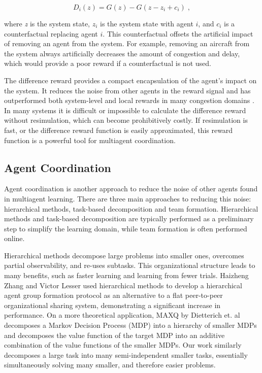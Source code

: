 \documentclass[onehalf,11pt]{beavtex}
\begin{document}
\begin{equation}
D_i(z) = G(z) - G(z - z_i + c_i)\;,
\end{equation}

where \textit{z} is the system state, $z_i$ is the system state with agent $i$, and $c_i$ is a counterfactual replacing agent $i$. This counterfactual offsets the artificial impact of removing an agent from the system. For example, removing an aircraft from the system always artificially decreases the amount of congestion and delay, which would provide a poor reward if a counterfactual is not used.

The difference reward provides a compact encapsulation of the agent's impact on the system. It reduces the noise from other agents in the reward signal and has outperformed both system-level and local rewards in many congestion domains \cite{AAMAS12-agmon, tumer-agogino_jaamas08, Agogino:2012:ELS:2330163.2330306, Colby:2012:SFF:2343576.2343637, Sislak:2008:AMA:1402744.1402755, tumer-wolpert_jair02}. In many systems it is difficult or impossible to calculate the difference reward without resimulation, which can become prohibitively costly. If resimulation is fast, or the difference reward function is easily approximated, this reward function is a powerful tool for multiagent coordination.

\subsection{Agent Coordination}

Agent coordination \cite{Nwana96co-ordinationin} is another approach to reduce the noise of other agents found in multiagent learning. There are three main approaches to reducing this noise: hierarchical methods, task-based decomposition and team formation. Hierarchical methods and task-based decomposition are typically performed as a preliminary step to simplify the learning domain, while team formation is often performed online. 

Hierarchical methods decompose large problems into smaller ones, overcomes partial observability, and re-uses subtasks. This organizational structure leads to many benefits, such as faster learning and learning from fewer trials. Haizheng Zhang and Victor Lesser \cite{Zhang-406} used hierarchical methods to develop a hierarchical agent group formation protocol as an alternative to a flat peer-to-peer organizational sharing system, demonstrating a significant increase in performance. On a more theoretical application, MAXQ by Dietterich et. al \cite{Dietterich00hierarchicalreinforcement} decomposes a Markov Decision Process (MDP) into a hierarchy of smaller MDPs and decomposes the value function of the target MDP into an additive combination of the value functions of the smaller MDPs. Our work similarly decomposes a large task into many semi-independent smaller tasks, essentially simultaneously solving many smaller, and therefore easier problems.
\end{document}
